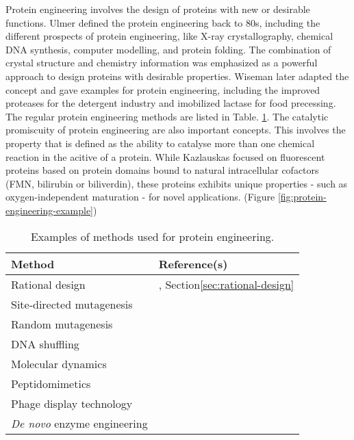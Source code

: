 \begin{refsection}
Protein engineering involves the design of proteins with new or
desirable functions. Ulmer  defined the protein engineering back
to 80s, including the different prospects of protein engineering, like X-ray
crystallography, chemical DNA synthesis, computer modelling, and protein
folding. The combination of crystal structure and chemistry information was
emphasized as a powerful approach to design proteins with desirable
properties\cite{Ulmer1983}. Wiseman  later adapted the concept
and gave examples for protein engineering, including the improved proteases for
the detergent industry\cite{Wiseman1993,Harwood1992} and imobilized lactase for
food precessing\cite{Wiseman1993}. The regular protein engineering methods are
listed in Table. \ref{tab:protein-engineering}. The catalytic promiscuity of
protein engineering are also important concepts. This involves the property
that is defined as the ability to catalyse more than one chemical reaction in
the acitive of a protein\cite{Kazlauskas2005}. While Kazlauskas 
focused on fluorescent proteins based on protein domains bound to natural
intracellular cofactors (FMN, bilirubin or biliverdin), these proteins exhibits
unique properties - such as oxygen-independent maturation - for novel
applications. (Figure \ref{fig:protein-engineering-example})
\begin{table}[h!]
    \centering
    \begin{tabular}{ ll }
        \hline
        Method & Reference(s) \\
        \hline
        
        Rational design & \cite{Arnold1993}, Section\ref{sec:rational-design} \\
        Site-directed mutagenesis & \cite{Antikainen2005} \\
        Random mutagenesis & \cite{Wong2006, Jackson2006, Labrou2010} \\
        DNA shuffling & \cite{ Jackson2006, Antikainen2005} \\
        Molecular dynamics & \cite{Anthonsen1994} \\
        Peptidomimetics & \cite{Venkatesan2002} \\
        Phage display technology & \cite{Sidhu2007,Chaput2008} \\
        \emph{De novo} enzyme engineering & \cite{Golynskiy2010} \\

        \hline
    \end{tabular}
    \caption[Examples of methods used for protein engineering.]{Examples of
        methods used for protein engineering\cite{Antikainen2005}.}
        \label{tab:protein-engineering}
\end{table}


\end{refsection}
